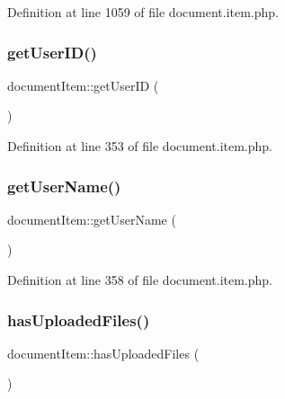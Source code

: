 Definition at line 1059 of file document.\+item.\+php.

\mbox{\label{classdocumentItem_a66a8157a3cc7c82325eadcefe6390a58}} 
\subsubsection{\texorpdfstring{get\+User\+I\+D()}{getUserID()}}
{\footnotesize\ttfamily document\+Item\+::get\+User\+ID (\begin{DoxyParamCaption}{ }\end{DoxyParamCaption})}



Definition at line 353 of file document.\+item.\+php.

\mbox{\label{classdocumentItem_a072696b683278c84bc3ebfee46d4216f}} 
\subsubsection{\texorpdfstring{get\+User\+Name()}{getUserName()}}
{\footnotesize\ttfamily document\+Item\+::get\+User\+Name (\begin{DoxyParamCaption}{ }\end{DoxyParamCaption})}



Definition at line 358 of file document.\+item.\+php.

\mbox{\label{classdocumentItem_af031d09271c9099d26b6619f9c436f68}} 
\subsubsection{\texorpdfstring{has\+Uploaded\+Files()}{hasUploadedFiles()}}
{\footnotesize\ttfamily document\+Item\+::has\+Uploaded\+Files (\begin{DoxyParamCaption}{ }\end{DoxyParamCaption})}



